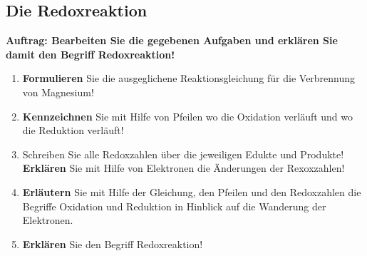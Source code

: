 \documentclass{scrartcl}  %
\begin{document}
\newpage
		\subsection{Die Redoxreaktion}
			\textbf{Auftrag: Bearbeiten Sie die gegebenen Aufgaben und erklären Sie damit den Begriff Redoxreaktion!}
			\begin{enumerate}
			    \item \textbf{Formulieren} Sie die ausgeglichene Reaktionsgleichung für die Verbrennung von Magnesium!
			    \item \textbf{Kennzeichnen} Sie mit Hilfe von Pfeilen wo die Oxidation verläuft und wo die Reduktion verläuft!
			    \item Schreiben Sie alle Redoxzahlen über die jeweiligen Edukte und Produkte! \textbf{Erklären} Sie mit Hilfe von Elektronen die Änderungen der Rexoxzahlen!
			    \item \textbf{Erläutern} Sie mit Hilfe der Gleichung, den Pfeilen und den Redoxzahlen die Begriffe Oxidation und Reduktion in Hinblick auf die Wanderung der Elektronen. 
			    \item \textbf{Erklären} Sie den Begriff Redoxreaktion!
			\end{enumerate}
\end{document}
